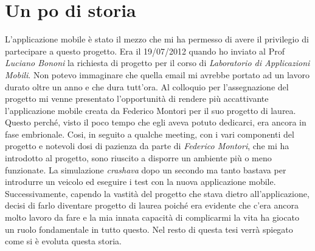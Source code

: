\section{Un po di storia}\label{sec:unpodistoria}

L'applicazione mobile è stato il mezzo che mi ha permesso di avere il privilegio di partecipare a questo progetto. Era il 19/07/2012 quando ho inviato al Prof \emph{Luciano Bononi} la richiesta di progetto per il corso di \emph{Laboratorio di Applicazioni Mobili}. Non potevo immaginare che quella email mi avrebbe portato ad un lavoro durato oltre un anno e che dura tutt'ora.
Al colloquio per l'assegnazione del progetto mi venne presentato l'opportunità di rendere più accattivante l'applicazione mobile creata da Federico Montori per il suo progetto di laurea. Questo perché, visto il poco tempo che egli aveva potuto dedicarci, era ancora in fase embrionale.
Cosi, in seguito a qualche meeting, con i vari componenti del progetto e notevoli dosi di pazienza da parte di \emph{Federico Montori}, che mi ha introdotto al progetto, sono riuscito a disporre un ambiente più o meno funzionate. La simulazione \emph{crashava} dopo un secondo ma tanto bastava per introdurre un veicolo ed eseguire i test con la nuova applicazione mobile.
Successivamente, capendo la vastità del progetto che stava dietro all'applicazione, decisi di farlo diventare progetto di laurea poiché era evidente che c'era ancora molto lavoro da fare e la mia innata capacità di complicarmi la vita ha giocato un ruolo fondamentale in tutto questo. Nel resto di questa tesi verrà spiegato come si è evoluta questa storia.
